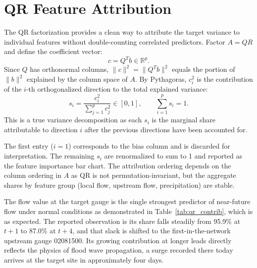 \documentclass[10pt, twocolumn]{article}
\begin{document}
\section{QR Feature Attribution}

The QR factorization provides a clean way to attribute the target variance to individual
features without double-counting correlated predictors.
Factor $A = QR$ and define the coefficient vector:
\[
  c = Q^T b \in \mathbb{R}^p.
\]
Since $Q$ has orthonormal columns, $\|c\|^2 = \|Q^Tb\|^2$ equals the portion of $\|b\|^2$
explained by the column space of $A$. By Pythagoras, $c_i^2$ is the contribution of the
$i$-th orthogonalized direction to the total explained variance:
\[
  s_i = \frac{c_i^2}{\sum_{j=1}^p c_j^2} \in [0,1], \qquad \sum_{i=1}^p s_i = 1.
\]
This is a true variance decomposition as each $s_i$ is the marginal share attributable to
direction $i$ after the previous directions have been accounted for.

The first entry ($i = 1$) corresponds to the bias column and is discarded for interpretation. The remaining $s_i$ are renormalized to sum to 1 and reported as the feature importance bar chart. The attribution ordering depends on the column ordering in $A$ as QR is not permutation-invariant, but the aggregate shares by feature group (local flow, upstream flow, precipitation) are stable.

The flow value at the target gauge is the single strongest predictor of near-future flow under normal conditions as demonstrated in Table~\ref{tab:qr_contrib}, which is as expected. The reported observation is its share falls steadily from 95.9\% at $t{+}1$ to 87.0\% at $t{+}4$, and that slack is shifted to the first-in-the-network upstream gauge 02081500. Its growing contribution at longer leads directly reflects the physics of flood wave propagation, a surge recorded there today arrives at the target site in approximately four days.
\end{document}
